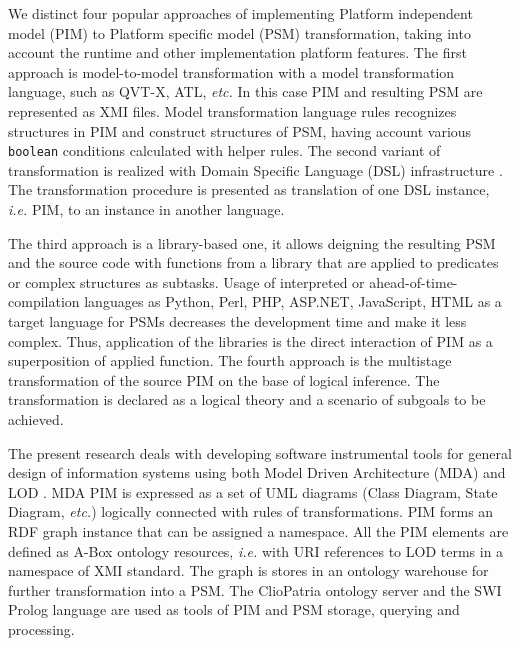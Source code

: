 \documentclass[runningheads]{llncs}
\begin{document}
We distinct four popular approaches of implementing Platform independent model (PIM) to Platform specific model (PSM) transformation, taking into account the runtime and other implementation platform features.  The first approach is model-to-model transformation with a model transformation language, such as QVT-X, ATL, \emph{etc.}  In this case PIM and resulting PSM are represented as XMI files.  Model transformation language rules recognizes structures in PIM and construct structures of PSM, having account various \texttt{boolean} conditions calculated with helper rules. The second variant of transformation is realized with Domain Specific Language (DSL) infrastructure \cite{stratego}.  The transformation procedure is presented as translation of one DSL instance, \emph{i.e.} PIM, to an instance in another language.

The third approach is a library-based one, it allows deigning the resulting PSM and the source code with functions from a library that are applied to predicates or complex structures as subtasks. Usage of interpreted or ahead-of-time-compilation languages as Python, Perl, PHP, ASP.NET, JavaScript, HTML as a target language for PSMs decreases the development time and make it less complex.  Thus, application of the libraries is the direct interaction of PIM as a superposition of applied function.  The fourth approach is the multistage transformation of the source PIM \cite{tereh1} on the base of logical inference.  The transformation is declared as a logical theory and a scenario of subgoals to be achieved.

The present research deals with developing software instrumental tools for general design of information systems using both Model Driven Architecture (MDA) and LOD \cite{MDA}.  MDA PIM is expressed as a set of UML diagrams (Class Diagram, State Diagram, \emph{etc.}) logically connected with rules of transformations.  PIM forms an RDF graph instance that can be assigned a namespace.  All the PIM elements are defined as A-Box ontology resources, \emph{i.e.} with URI references to LOD terms in a namespace of XMI standard.  The graph is stores in an ontology warehouse for further transformation into a PSM. %
The ClioPatria ontology server and the SWI Prolog language \cite{Clio} are used as tools of PIM and PSM storage, querying and processing.
\end{document}
